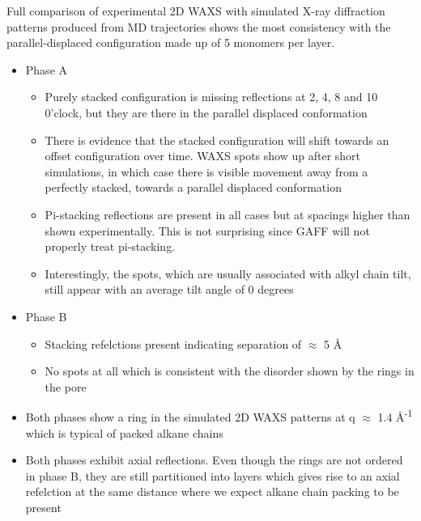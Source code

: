 \documentclass{article}
\newcommand{\angstrom}{\textup{\AA}}
\begin{document}
	Full comparison of experimental 2D WAXS with simulated X-ray diffraction patterns produced from MD trajectories shows the most consistency with the parallel-displaced configuration made up of 5 monomers per layer.
	\begin{itemize}
		\item Phase A
		\begin{itemize}	
			\item Purely stacked configuration is missing reflections at 2, 4, 8 and 10 0'clock, but they are there in the parallel displaced conformation
			\item There is evidence that the stacked configuration will shift towards an offset configuration over time. WAXS spots show up after short simulations, in which case there is visible movement away from a perfectly stacked, towards a parallel displaced conformation 
			\item Pi-stacking reflections are present in all cases but at spacings higher than shown experimentally. This is not surprising since GAFF will not properly treat pi-stacking.
			\item Interestingly, the spots, which are usually associated with alkyl chain tilt, still appear with an average tilt angle of 0 degrees
		\end{itemize}
		\item Phase B
		\begin{itemize}
			\item Stacking refelctions present indicating separation of $\approx$ 5 \angstrom
			\item No spots at all which is consistent with the disorder shown by the rings in the pore
		\end{itemize}
		\item Both phases show a ring in the simulated 2D WAXS patterns at q $\approx$ 1.4 \angstrom\textsuperscript{-1} which is typical of packed alkane chains
		\item Both phases exhibit axial reflections. Even though the rings are not ordered in phase B, they are still partitioned into layers which gives rise to an axial refelction at the same distance where we expect alkane chain packing to be present   
	\end{itemize} 
\end{document}
